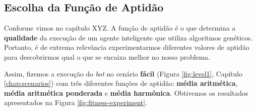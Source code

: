 \subsection{\label{section:fitness-experiment}Escolha da Função de Aptidão}


Conforme vimos no capítulo XYZ. A função de aptidão é o que determina a
\textbf{qualidade} da execução de um agente inteligente que utiliza algoritmos
genéticos. Portanto, é de extrema relevância experimentarmos diferentes valores
de aptidão para descobrirmos qual o que se encaixa melhor no nosso problema.

Assim, fizemos a execução do \textit{bot} no cenário \textbf{fácil} (Figura
\ref{fig:level1}, Capítulo \ref{chap:scenarios}) com três diferentes funções de
aptidão: \textbf{média aritmética}, \textbf{média aritmética ponderada} e
\textbf{média harmônica}. Obtivemos os resultados apresentados na Figura
\ref{fig:fitness-experiment}.

